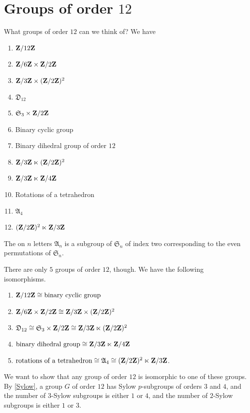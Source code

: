 \documentclass[11pt, twoside]{amsart}
\begin{document}
\section{Groups of order $12$}
What groups of order $12$ can we think of? We have 
\begin{enumerate}
\item $\mathbf{Z}/12\mathbf{Z}$ 
\item $\mathbf{Z}/6\mathbf{Z}\times \mathbf{Z}/2\mathbf{Z}$
\item $\mathbf{Z}/3\mathbf{Z}\times (\mathbf{Z}/2\mathbf{Z})^2$
\item  $\mathfrak{D}_{12}$
\item  $\mathfrak{S}_3 \times \mathbf{Z}/2\mathbf{Z}$
\item Binary cyclic group 
\item Binary dihedral group of order $12$
\item $\mathbf{Z}/3\mathbf{Z} \ltimes (\mathbf{Z}/2\mathbf{Z})^2$
\item $\mathbf{Z}/3\mathbf{Z} \ltimes \mathbf{Z}/4\mathbf{Z} $
\item Rotations of a tetrahedron
\item $\mathfrak{A}_4$
\item $(\mathbf{Z}/2\mathbf{Z} )^2 \ltimes \mathbf{Z}/3\mathbf{Z} $
\end{enumerate}

\begin{definition}
The  on $n$ letters $\mathfrak{A}_n$ is a subgroup of $\mathfrak{S}_n$ of index two corresponding to the even permutations of $\mathfrak{S}_n$.
\end{definition}

There are only $5$ groups of order $12$, though. We have the following isomorphisms. 
\begin{enumerate}
\item $\mathbf{Z}/ {12}\mathbf{Z}\cong \textrm{binary cyclic group}$
\item  $\mathbf{Z}/6\mathbf{Z}  \times \mathbf{Z}/2\mathbf{Z}  \cong \mathbf{Z}/3\mathbf{Z}  \times (\mathbf{Z}/2\mathbf{Z} )^2$
\item $\mathfrak{D}_{12} \cong \mathfrak{S}_3 \times \mathbf{Z}/2\mathbf{Z} \cong \mathbf{Z}/3\mathbf{Z}  \ltimes (\mathbf{Z}/2\mathbf{Z})^2$
\item $\textrm{binary dihedral group} \cong \mathbf{Z}/3\mathbf{Z} \ltimes \mathbf{Z}/4\mathbf{Z}$
\item $\textrm{rotations of a tetrahedron} \cong \mathfrak{A}_4 \cong (\mathbf{Z}/2\mathbf{Z})^2 \ltimes \mathbf{Z}/3\mathbf{Z} $.
\end{enumerate}

We want to show that any group of order $12$ is isomorphic to one of these groups. By \cref{Sylow}, a group $G$ of order $12$ has Sylow $p$-subgroups of orders $3$ and $4$, and the number of $3$-Sylow subgroups is either $1$ or $4$, and the number of $2$-Sylow subgroups is either $1$ or $3$.
\end{document}
